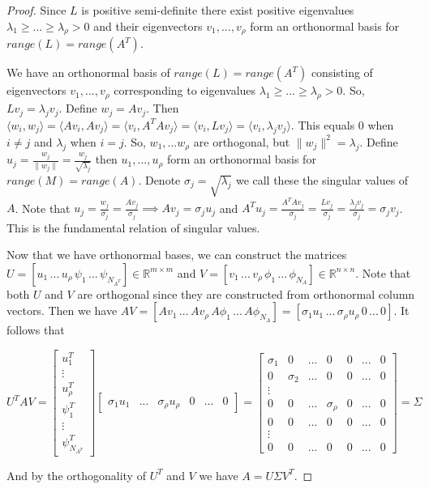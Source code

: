 \documentclass[11pt]{article}
\def\R{{\mathbb{R}}}
\begin{document}
\begin{proof}
\item Since $L$ is positive semi-definite there exist positive eigenvalues $\lambda_1 \geq ... \geq \lambda_\rho > 0$ and their eigenvectors $v_1, ..., v_\rho$ form an orthonormal basis for $\mathit{range}(L) = \mathit{range}(A^T)$.

\item We have an orthonormal basis of $\mathit{range}(L) = \mathit{range}(A^T)$ consisting of eigenvectors $v_1, ..., v_\rho$ corresponding to eigenvalues $\lambda_1 \geq ... \geq \lambda_\rho > 0$. So, $Lv_j = \lambda_j v_j$. Define $w_j = Av_j$. Then $\langle w_i, w_j \rangle = \langle Av_i, Av_j \rangle = \langle v_i, A^{T}Av_j \rangle = \langle v_i, Lv_j \rangle = \langle v_i, \lambda_j v_j \rangle$. This equals $0$ when $i \neq j$ and $\lambda_j$ when $i = j$. So, $w_1, ... w_\rho$ are orthogonal, but $\|w_j\|^2 = \lambda_j$. Define $u_j = \frac{w_j}{\|w_j\|} = \frac{w_j}{\sqrt{\lambda_j}}$ then $u_1, ..., u_\rho$ form an orthonormal basis for $\mathit{range}(M) = \mathit{range}(A)$. Denote $\sigma_j = \sqrt{\lambda_j}$ we call these the singular values of $A$. Note that $u_j = \frac{w_j}{\sigma_j} = \frac{Av_j}{\sigma_j} \implies Av_j = \sigma_j u_j$ and $A^T u_j = \frac{A^{T}Av_j}{\sigma_j} = \frac{Lv_j}{\sigma_j} = \frac{\lambda_j v_j}{\sigma_j} = \sigma_j v_j$. This is the fundamental relation of singular values.

\item Now that we have orthonormal bases, we can construct the matrices $U = [u_1\, ...\, u_\rho\, \psi_1\, ...\, \psi_{N_{A^T}}] \in \R^{m \times m} $ and $V = [v_1\, ...\, v_\rho\, \phi_1\, ...\, \phi_{N_A}] \in \R^{n \times n}$. Note that both $U$ and $V$ are orthogonal since they are constructed from orthonormal column vectors. Then we have $AV = [Av_1\, ...\, Av_\rho\, A\phi_1\, ...\, A\phi_{N_A}] = [\sigma_1 u_1 \, ... \, \sigma_\rho u_\rho \, 0 \, ... \, 0]$. It follows that

\begin{equation}
U^{T}AV = \begin{bmatrix}
		u_{1}^{T} \\
		\vdots \\
		u_{\rho}^{T} \\
		\psi_{1}^{T} \\
		\vdots \\
		\psi_{N_{A^T}}^{T}
	   \end{bmatrix}
\begin{bmatrix}
\sigma_1 u_1 & ... & \sigma_\rho u_\rho & 0 & ... & 0
\end{bmatrix} = 
\begin{bmatrix}
\sigma_1 & 0 & ... & 0 & 0 & ... & 0 \\
0 & \sigma_2 & ... & 0 & 0 & ... & 0 \\
\vdots \\
0 & 0 & ... & \sigma_\rho & 0 & ... & 0 \\
0 & 0 & ... & 0 & 0 & ... & 0 \\
\vdots \\
0 & 0 & ... & 0 & 0 & ... & 0
\end{bmatrix} = \Sigma
\end{equation}

And by the orthogonality of $U^T$ and $V$ we have $A = U \Sigma V^T$.

\end{proof}
\end{document}
